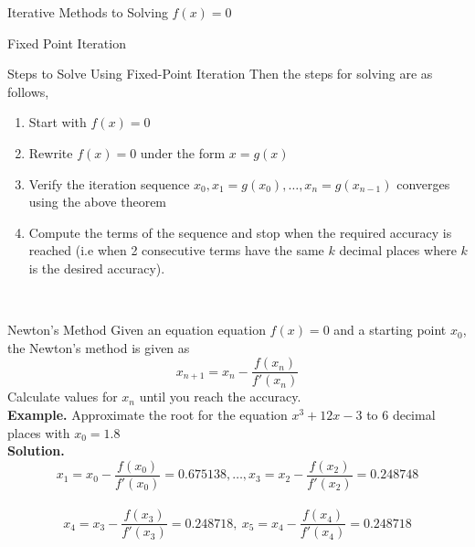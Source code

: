 \documentclass{article}
\begin{document}
\begin{multicols*}{3}
\begin{blackbox}{Iterative Methods to Solving $f(x) = 0$}
\begin{bluebox}{Fixed Point Iteration}
\begin{redbox}{Steps to Solve Using Fixed-Point Iteration}
                Then the steps for solving are as follows,
                \begin{enumerate}
                    \item Start with $f(x) = 0$
                    \item Rewrite $f(x) = 0$ under the form $x = g(x)$
                    \item Verify the iteration sequence $x_0, x_1 = g(x_0), \ldots, x_n = g(x_{n-1})$ converges using the above theorem 
                    \item Compute the terms of the sequence and stop when the required accuracy is reached (i.e when 2 consecutive terms have the same $k$ decimal places where $k$ is the desired accuracy).
                \end{enumerate}
            \end{redbox}
        \end{bluebox}\\[-2ex]
    \end{blackbox}
    \begin{blackbox}{Newton's Method}
        Given an equation equation $f(x) = 0$ and a starting point $x_0$, the Newton's method is given as\\[-2ex]
        \[x_{n+1} = x_n - \frac{f(x_n)}{f'(x_n)}\]
        Calculate values for $x_n$ until you reach the accuracy.\\
        {\footnotesize
        \textbf{Example.} Approximate the root for the equation $x^3 + 12x - 3$ to 6 decimal places with $x_0 = 1.8$  \\
        \textbf{Solution.}\\[-5ex]
        \[x_1 = x_0 - \frac{f(x_0)}{f'(x_0)} = 0.675138, \ldots, x_3 = x_2 - \frac{f(x_2)}{f'(x_2)} = 0.248748\]\\[-4ex]        \[x_4 = x_3 - \frac{f(x_3)}{f'(x_3)} = 0.248718, \ x_5 = x_4 - \frac{f(x_4)}{f'(x_4)} = 0.248718\]
        }
    \end{blackbox}
\end{multicols*}
\end{document}
